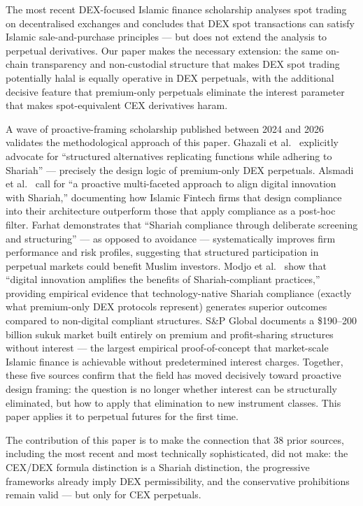 \documentclass[10pt,twocolumn]{article}
\begin{document}
The most recent DEX-focused Islamic finance scholarship \cite{ResearchGate2026}
analyses spot trading on decentralised exchanges and concludes that DEX spot
transactions can satisfy Islamic sale-and-purchase principles --- but does not
extend the analysis to perpetual derivatives.
Our paper makes the necessary extension: the same on-chain transparency and
non-custodial structure that makes DEX spot trading potentially halal is equally
operative in DEX perpetuals, with the additional decisive feature that premium-only
perpetuals eliminate the interest parameter that makes spot-equivalent CEX
derivatives haram.

A wave of proactive-framing scholarship published between 2024 and 2026 validates
the methodological approach of this paper. Ghazali et al.\ \cite{Ghazali2025}
explicitly advocate for ``structured alternatives replicating functions while
adhering to Shariah'' --- precisely the design logic of premium-only DEX
perpetuals. Alsmadi et al.\ \cite{Alsmadi2025} call for ``a proactive
multi-faceted approach to align digital innovation with Shariah,'' documenting
how Islamic Fintech firms that design compliance into their architecture
outperform those that apply compliance as a post-hoc filter. Farhat
\cite{Farhat2025} demonstrates that ``Shariah compliance through deliberate
screening and structuring'' --- as opposed to avoidance --- systematically
improves firm performance and risk profiles, suggesting that structured
participation in perpetual markets could benefit Muslim investors. Modjo et al.\
\cite{Modjo2025} show that ``digital innovation amplifies the benefits of
Shariah-compliant practices,'' providing empirical evidence that technology-native
Shariah compliance (exactly what premium-only DEX protocols represent) generates
superior outcomes compared to non-digital compliant structures.
S\&P Global \cite{SP2025} documents a \$190--200 billion sukuk market built
entirely on premium and profit-sharing structures without interest --- the
largest empirical proof-of-concept that market-scale Islamic finance is achievable
without predetermined interest charges. Together, these five sources confirm that
the field has moved decisively toward proactive design framing: the question is
no longer whether interest can be structurally eliminated, but how to apply that
elimination to new instrument classes. This paper applies it to perpetual futures
for the first time.

The contribution of this paper is to make the connection that 38 prior sources,
including the most recent and most technically sophisticated, did not make:
the CEX/DEX formula distinction is a Shariah distinction, the progressive
frameworks already imply DEX permissibility, and the conservative prohibitions
remain valid --- but only for CEX perpetuals.
\end{document}
